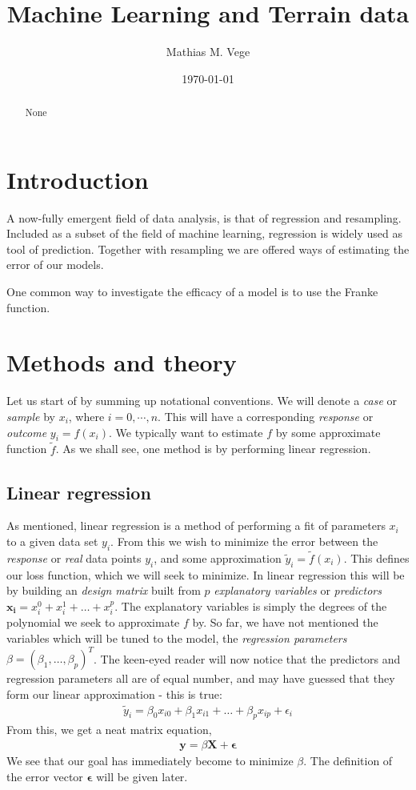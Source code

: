 \documentclass[11pt]{article}
\title{Machine Learning and Terrain data}
\author{Mathias M. Vege}
\date{\today}
\begin{document}
\maketitle

\begin{abstract}
None
\end{abstract}

\tableofcontents

\section{Introduction}
A now-fully emergent field of data analysis, is that of regression and resampling. Included as a subset of the field of machine learning, regression is widely used as tool of prediction. Together with resampling we are offered ways of estimating the error of our models.

One common way to investigate the efficacy of a model is to use the Franke function\cite{franke1979critical}.

\section{Methods and theory}
Let us start of by summing up notational conventions. We will denote a \textit{case} or \textit{sample} by $x_i$, where $i=0,\cdots,n$. This will have a corresponding \textit{response} or \textit{outcome} $y_i = f(x_i)$. We typically want to estimate $f$ by some approximate function $\tilde{f}$. As we shall see, one method is by performing linear regression.

\subsection{Linear regression}
As mentioned, linear regression is a method of performing a fit of parameters $x_i$ to a given data set $y_i$. From this we wish to minimize the error between the \textit{response} or \textit{real} data points $y_i$, and some approximation $\tilde{y}_i=\tilde{f}(x_i)$. This defines our loss function, which we will seek to minimize. In linear regression this will be by building an \textit{design matrix} built from $p$ \textit{explanatory variables} or \textit{predictors} $\bm{x_i}=x_i^0+x_i^1+\dots+x_i^p$. The explanatory variables is simply the degrees of the polynomial we seek to approximate $f$ by. So far, we have not mentioned the variables which will be tuned to the model, the \textit{regression parameters} $\beta=(\beta_1,\dots,\beta_p)^T$. The keen-eyed reader will now notice that the predictors and regression parameters all are of equal number, and may have guessed that they form our linear approximation - this is true:
\begin{align*}
    \tilde{y}_i = \beta_0 x_{i0} + \beta_1 x_{i1} + \dots + \beta_p x_{ip} + \epsilon_i
\end{align*}
From this, we get a neat matrix equation,
\begin{align}
    \bm{y} = \beta \bm{X} + \bm{\epsilon}
    \label{eq:linreg_eq}
\end{align}
We see that our goal has immediately become to minimize $\beta$. The definition of the error vector $\bm{\epsilon}$ will be given later.
\end{document}
